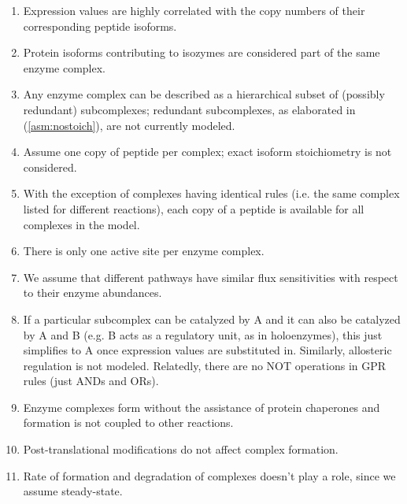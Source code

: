 

\begin{enumerate}
\item \label{asm:expcorr}
Expression values are highly correlated with the copy numbers of their
corresponding peptide isoforms.
\item \label{asm:isozyme} 
Protein isoforms contributing to isozymes are considered part of the
same enzyme complex.
\item \label{asm:hierarchy}
Any enzyme complex can be described as a hierarchical subset of
(possibly redundant) subcomplexes; redundant subcomplexes, as
elaborated in (\ref{asm:nostoich}), are not currently modeled.
\item \label{asm:nostoich} 
Assume one copy of peptide per complex; exact isoform stoichiometry
is not considered.
\item \label{asm:sharing} 
With the exception of complexes having identical rules (i.e. the same
complex listed for different reactions), each copy of a peptide
is available for all complexes in the model.
\item \label{asm:active_site}
There is only one active site per enzyme complex.
\item \label{asm:enzyme_sensitivity} 
We assume that different pathways have similar flux sensitivities
with respect to their enzyme abundances.
\item \label{asm:holo} 
If a particular subcomplex can be catalyzed by A and it can also be
catalyzed by A and B (e.g. B acts as a regulatory unit, as in
holoenzymes), this just simplifies to A once expression values are
substituted in. Similarly, allosteric regulation is not
modeled. Relatedly, there are no NOT operations in GPR rules (just ANDs
and ORs).
\item \label{asm:chap} 
Enzyme complexes form without the assistance of protein chaperones and
formation is not coupled to other reactions.
\item \label{asm:posttrans}
Post-translational modifications do not affect complex formation.
\item \label{asm:rate} 
Rate of formation and degradation of complexes doesn't play a role,
since we assume steady-state. 
\end{enumerate}
